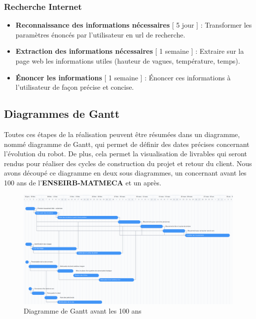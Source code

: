 \subsubsection{Recherche Internet}
\begin{itemize}
    \item \textbf{Reconnaissance des informations nécessaires} [ 5 jour ] : Transformer les paramètres énoncés par l'utilisateur en url de recherche.
    \item \textbf{Extraction des informations nécessaires} [ 1 semaine ] : Extraire sur la page web les informations utiles (hauteur de vagues, température, temps).
    \item \textbf{Énoncer les informations} [ 1 semaine ] : Énoncer ces informations à l'utilisateur de façon précise et concise.
\end{itemize}

\subsection{Diagrammes de Gantt}
Toutes ces étapes de la réalisation peuvent être résumées dans un diagramme, nommé diagramme de Gantt, qui permet de définir des dates précises concernant l'évolution du robot. De plus, cela permet la visualisation de livrables qui seront rendus pour réaliser des cycles de construction du projet et retour du client. Nous avons découpé ce diagramme en deux sous diagrammes, un concernant avant les 100 ans de l'\textbf{ENSEIRB-MATMECA} et un après.
\begin{center}
    \begin{figure}[!ht]
        \includegraphics[width=\textwidth]{GANTT_avant_100_ans.png}
        \caption{Diagramme de Gantt avant les 100 ans}
        \label{fig:gantt_avant}
        \end{figure}
\end{center}

